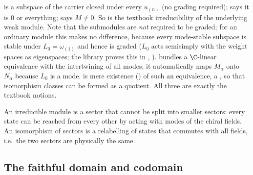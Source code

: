 \begin{dictionary}
 is a subspace of the carrier closed under every $u_{(n)}$ (no grading
required);  says it is $0$ or everything;  says $M\neq0$. So
 is the textbook irreducibility of the underlying weak module. Note that the submodules are
\emph{not} required to be graded; for an ordinary module this makes no difference, because every mode-stable subspace is
stable under $L_0 = \omega_{(1)}$ and hence is graded ($L_0$ acts semisimply with the weight spaces as eigenspaces;
the library proves this in , ).
 bundles a $\C$-linear equivalence with the intertwining of all modes; it automatically maps
$M_\alpha$ onto $N_\alpha$ because $L_0$ is a mode.  is mere existence () of such an
equivalence, a , so that isomorphism classes can be formed as a quotient. All three are exactly the textbook
notions.
\end{dictionary}

\begin{physics}
An irreducible module is a sector that cannot be split into smaller sectors: every state can be reached from every other
by acting with modes of the chiral fields. An isomorphism of sectors is a relabelling of states that commutes with all
fields, i.e.\ the two sectors are physically the same.
\end{physics}

\subsection{The faithful domain and codomain}

